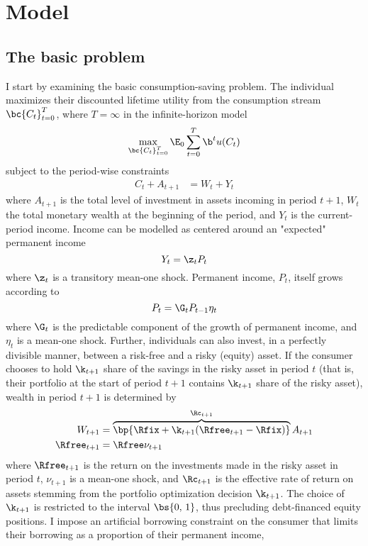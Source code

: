 \section{Model}\label{model}

\subsection{The basic problem}

I start by examining the basic consumption-saving problem. The individual maximizes their discounted lifetime utility from the consumption stream $\bc{C_{t}}_{t=0}^{T}$, where $T = \infty$ in the infinite-horizon model
\begin{equation}\label{eq:prb}
   \max_{\bc{C_t}_{t=0}^{T}}\E_{0}\sum_{t=0}^{T}\b^t u(C_t)
\end{equation}
subject to the period-wise constraints
\begin{align*}
    C_{t} + A_{t+1} &= W_{t} + Y_{t}
\end{align*}
where $A_{t+1}$ is the total level of investment in assets incoming in period $t+1$, $W_{t}$ the total monetary wealth at the beginning of the period, and $Y_{t}$ is the current-period income. Income can be modelled as centered around an "expected" permanent income
\begin{equation}\label{eq:inc}
    Y_t = \z_t P_t
\end{equation}
where $\z_t$ is a transitory mean-one shock. Permanent income, $P_t$, itself grows according to
\begin{equation}\label{eq:perm_inc}
    P_t = \G_t P_{t-1} \eta_t
\end{equation}
where $\G_t$ is the predictable component of the growth of permanent income, and $\eta_t$ is a mean-one shock. Further, individuals can also invest, in a perfectly divisible manner, between a risk-free and a risky (equity) asset. If the consumer chooses to hold $\k_{t+1}$ share of the savings in the risky asset in period $t$ (that is, their portfolio at the start of period $t+1$ contains $\k_{t+1}$ share of the risky asset), wealth in period $t+1$ is determined by
\begin{align}
    W_{t+1} &= \overbrace{\bp{\Rfix + \k_{t+1}(\Rfree_{t+1} - \Rfix)}}^{\Rc_{t+1}}A_{t+1} \label{eq:wealth}\\
    \Rfree_{t+1} &= \Rfree \nu_{t+1} \label{eq:return}
\end{align}
where $\Rfree_{t+1}$ is the return on the investments made in the risky asset in period $t$, $\nu_{t+1}$ is a mean-one shock, and $\Rc_{t+1}$ is the effective rate of return on assets stemming from the portfolio optimization decision $\k_{t+1}$. The choice of $\k_{t+1}$ is restricted to the interval $\bs{0,\,1}$, thus precluding debt-financed equity positions. I impose an artificial borrowing constraint on the consumer that limits their borrowing as a proportion of their permanent income,
